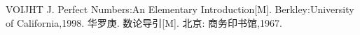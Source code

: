 \clearpage{}
{}
%
\begin{thebibliography}{99}
VOIJHT J. Perfect Numbers:An Elementary Introduction[M]. Berkley:University of California,1998.
华罗庚. 数论导引[M]. 北京: 商务印书馆,1967.
\end{thebibliography}

\nocite{*}

